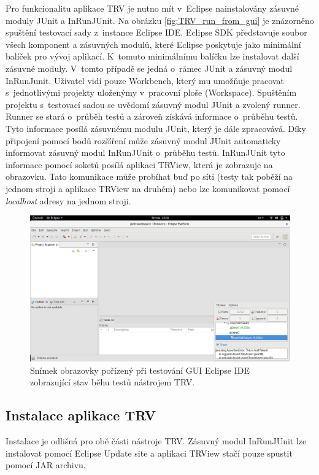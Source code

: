   Pro funkcionalitu aplikace TRV je nutno mít v~Eclipse nainstalovány zásuvné moduly JUnit a InRunJUnit. Na obrázku \ref{fig:TRV_run_from_gui} je znázorněno spuštění testovací sady z~instance Eclipse IDE. Eclipse SDK představuje soubor všech komponent a zásuvných modulů, které Eclipse poskytuje jako minimální balíček pro vývoj aplikací. K~tomuto minimálnímu balíčku lze instalovat další zásuvné moduly. V~tomto případě se jedná o~rámec JUnit a zásuvný modul InRunJunit. Uživatel vidí pouze Workbench, který mu umožňuje pracovat s~jednotlivými projekty uloženýmy v~pracovní ploše (Workspace). Spuštěním projektu s~testovací sadou se uvědomí zásuvný modul JUnit a zvolený runner. Runner se stará o~průběh testů a zároveň získává informace o~průběhu testů. Tyto informace posílá zásuvnému modulu JUnit, který je dále zpracovává. Díky připojení pomocí bodů rozšíření může zásuvný modul JUnit automaticky informovat zásuvný modul InRunJUnit o~průběhu testů. InRunJUnit tyto informace pomocí soketů posílá aplikaci TRView, která je zobrazuje na obrazovku. Tato komunikace může probíhat buď po síti (testy tak poběží na jednom stroji a aplikace TRView na druhém) nebo lze komunikovat pomocí \emph{localhost} adresy na jednom stroji.

  \begin{figure}
    \includegraphics[width=\textwidth, center]{obrazky-figures/TRV_screenshot.png}
    \caption{Snímek obrazovky pořízený při testování GUI Eclipse IDE zobrazující stav běhu testů nástrojem TRV.}
    \label{fig:TRV_screenshot}
  \end{figure}

      \subsection{Instalace aplikace TRV}
      Instalace je odlišná pro obě části nástroje TRV. Zásuvný modul InRunJUnit lze instalovat pomocí Eclipse Update site a aplikaci TRView stačí pouze spustit pomocí JAR archivu.

